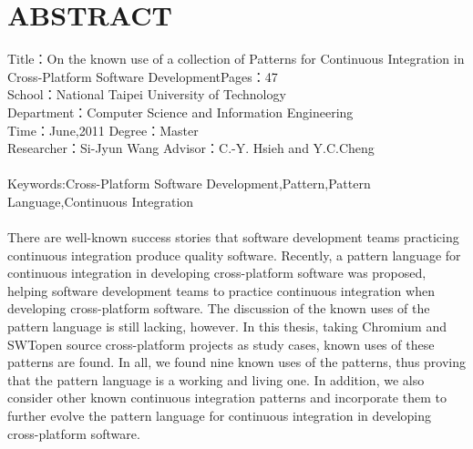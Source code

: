 \chapter*{ABSTRACT}


\noindent
Title：On the known use of a collection of Patterns for Continuous Integration in Cross-Platform Software Development\hspace*{\fill}Pages：47		   \\
School：National Taipei University of Technology						  		   \\
Department：Computer Science and Information Engineering						   \\
Time：June,2011									  \hspace*{\fill}Degree：Master	   \\
Researcher：Si-Jyun Wang							  \hspace*{\fill}Advisor：C.-Y. Hsieh and Y.C.Cheng\\
\hspace*{\fill}\\
Keywords:Cross-Platform Software Development,Pattern,Pattern Language,Continuous Integration\\
\hspace*{\fill}\\
%
\indent
There are well-known success stories that software development teams practicing continuous integration produce quality software. Recently, a pattern language for continuous integration in developing cross-platform software was proposed, helping software development teams to practice continuous integration when developing cross-platform software. The discussion of the known uses of the pattern language is still lacking, however. In this thesis, taking Chromium and SWT\hspace{3pt}\textendash\hspace{3pt}open source  cross-platform projects as study cases, known uses of these patterns are found. In all, we found nine known uses of the patterns, thus proving that the pattern language is a working and living one. In addition, we also consider other known continuous integration patterns and incorporate them to further evolve the pattern language for continuous integration in developing cross-platform software.
